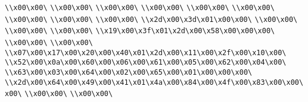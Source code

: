 \verb|\\x00\x00\|\newline
\verb|\\x00\x00\|\newline
\verb|\\x00\x00\|\newline
\verb|\\x00\x00\|\newline
\verb|\\x00\x00\|\newline
\verb|\\x00\x00\|\newline
\verb|\\x00\x00\|\newline
\verb|\\x00\x00\|\newline
\verb|\\x00\x00\|\newline
\verb|\\x2d\x00\x3d\x01\x00\x00\|\newline
\verb|\\x00\x00\|\newline
\verb|\\x00\x00\|\newline
\verb|\\x00\x00\|\newline
\verb|\\x19\x00\x3f\x01\x2d\x00\x58\x00\x00\x00\|\newline
\verb|\\x00\x00\|\newline
\verb|\\x00\x00\|\newline
\verb|\\x07\x00\x17\x00\x20\x00\x40\x01\x2d\x00\x11\x00\x2f\x00\x10\x00\|\newline
\verb|\\x52\x00\x0a\x00\x60\x00\x06\x00\x61\x00\x05\x00\x62\x00\x04\x00\|\newline
\verb|\\x63\x00\x03\x00\x64\x00\x02\x00\x65\x00\x01\x00\x00\x00\|\newline
\verb|\\x2d\x00\x64\x00\x49\x00\x41\x01\x4a\x00\x84\x00\x4f\x00\x83\x00\x00\x00\|\newline
\verb|\\x00\x00\|\newline
\verb|\\x00\x00\|\newline
